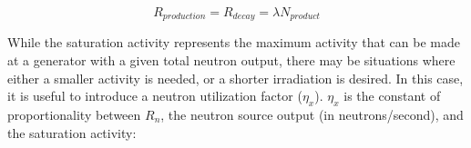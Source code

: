\documentclass[5p]{elsarticle}
\newcommand{\pp}[1]{\left( #1\right)}
\begin{document}
 \begin{equation}
R_{production} = R_{decay} = \lambda N_{product}
\end{equation}
% 
% 
% 
% 
% 
% 
% 
% 
% 
% 
% 


While the saturation activity represents the maximum activity that can be made at a generator with a given total neutron output, there may be situations where either a smaller activity is needed, or a shorter irradiation is desired. 
In this case, it is useful to introduce a neutron utilization factor ($\eta_x$).  $\eta_x$ is the constant of proportionality between $R_n$, the neutron source output (in neutrons/second), and the saturation activity:
\end{document}
